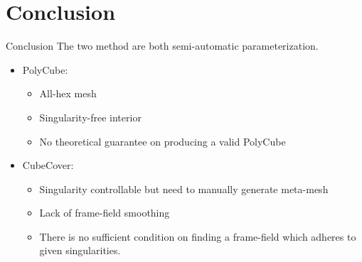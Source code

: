 \documentclass{beamer}
\begin{document}
\section{Conclusion}
\begin{frame}{Conclusion}
The two method are both semi-automatic parameterization.
\begin{itemize}
\item PolyCube: 
  \begin{itemize}
    \item All-hex mesh
    \item Singularity-free interior
    \item No theoretical guarantee on producing a valid PolyCube
    \end{itemize}

\item CubeCover: 
  \begin{itemize}
    \item Singularity controllable but need to manually generate meta-mesh
    \item Lack of frame-field smoothing
    \item There is no sufficient condition on finding a frame-field which adheres to given singularities.
    \end{itemize}
\end{itemize}
\end{frame}
\end{document}
